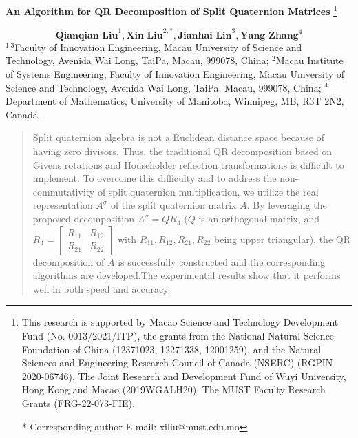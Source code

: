 \documentclass[12pt]{article}
\newcommand\blfootnote[1]{%
  \begingroup
  \renewcommand\thefootnote{}\footnote{#1}%
  \addtocounter{footnote}{-1}%
  \endgroup
}
\begin{document}

\begin{center}

{\LARGE \textbf{An Algorithm for QR Decomposition of Split Quaternion Matrices} }
\blfootnote{This research is supported by Macao Science and Technology Development Fund (No. 0013/2021/ITP), the grants from the National Natural Science Foundation of China  (12371023, 12271338, 12001259), and the Natural Sciences and Engineering Research Council of Canada (NSERC) (RGPIN 2020-06746), The Joint Research and Development Fund of Wuyi University, Hong Kong and Macao (2019WGALH20), The MUST Faculty Research Grants (FRG-22-073-FIE). \par
* Corresponding author
E-mail: xiliu@must.edu.mo
 }
 
\bigskip
$${\textbf{Qianqian Liu}^{1}, \textbf{Xin Liu}^{2, \ast}, \textbf{Jianhai Lin}^{3}, \textbf{Yang Zhang}^{4}}$$
\newline $^{\text{1,3}}$Faculty of Innovation Engineering, Macau University of Science and Technology, Avenida Wai Long, TaiPa, Macau, 999078, China; 
\newline $^{\text{2}}$Macau Institute of Systems Engineering, Faculty of Innovation Engineering, Macau University of Science and Technology, Avenida Wai Long, TaiPa, Macau, 999078, China;
\newline $^{\text{4}}$ Department of Mathematics, University of Manitoba, Winnipeg, MB, R3T 2N2, Canada. \\
\bigskip
\end{center}

\begin{abstract}
Split quaternion algebra is not a Euclidean distance space because of having zero divisors. Thus, the traditional QR decomposition based on Givens rotations and Householder reflection transformations is difficult to implement. To overcome this difficulty and to address the non-commutativity of split quaternion multiplication, we utilize the real representation $A^\sigma$ of the split quaternion matrix $A$. By leveraging the proposed decomposition $A^\sigma = \widetilde{Q}R_4$ ($\widetilde{Q}$ is an orthogonal matrix, and $R_4 = \begin{bmatrix} R_{11} & R_{12} \\ R_{21} & R_{22} \end{bmatrix}$ with $R_{11}, R_{12}, R_{21}, R_{22}$ being upper triangular), the QR decomposition of $A$ is successfully constructed and the corresponding algorithms are developed.The experimental results show that it performs well in both speed and accuracy.
\end{abstract}
\end{document}
